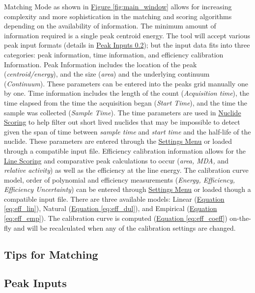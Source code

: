 \documentclass[12pt,report,justified]{SANDreport}
\begin{document}
Matching Mode as shown in \hyperref[fig:main_window]{Figure \ref{fig:main_window}} allows for 
increasing complexity and more sophistication in the matching and scoring algorithms depending 
on the availability of information. The minimum amount of information required is a single peak 
centroid energy. The tool will accept various peak input formats (details in 
\hyperref[sec:peak_inp]{Peak Inputs \ref{sec:peak_inp}}); but the input data fits into three 
categories: peak information, time information, and efficiency calibration Information. Peak 
Information includes the location of the peak (\textit{centroid/energy}), and the size 
(\textit{area}) and the underlying continuum (\textit{Continuum}). These parameters can be 
entered into the peaks grid manually one by one. Time information includes the length of the count 
(\textit{Acquisition time}), the time elapsed from the time the acquisition began 
(\textit{Start Time}), and the time the sample was collected (\textit{Sample Time}). The time 
parameters are used in \hyperref[sec:score]{Nuclide Scoring} to help filter out short lived 
nuclides that may be impossible to detect given the span of time between \textit{sample time} and 
\textit{start time} and the half-life of the nuclide. These parameters are entered through the 
\hyperref[sec:set_menu]{Settings Menu} or loaded through a compatible input file. Efficiency 
calibration information allows for the \hyperref[sec:sec:ln_score]{Line Scoring} and comparative 
peak calculations to occur (\textit{area, MDA,} and \textit{relative activity}) as well as the 
efficiency at the line energy. The calibration curve model, order of polynomial and efficiency 
measurements (\textit{Energy, Efficiency, Efficiency Uncertainty}) can be entered through 
\hyperref[sec:set_menu]{Settings Menu} or loaded though a compatible input file. There are three 
available models: Linear (\hyperref[sec:eq:eff_lin]{Equation \ref{eq:eff_lin}}), Natural 
(\hyperref[eq:eff_dul]{Equation \ref{eq:eff_dul}}), and Empirical 
(\hyperref[eq:eff_emp]{Equation \ref{eq:eff_emp}}). The calibration curve is computed 
(\hyperref[eq:eff_coeff]{Equation \ref{eq:eff_coeff}}) on-the-fly and will be recalculated when any 
of the calibration settings are changed.

\subsection{Tips for Matching} \label{sec:match_tips}
\subsection{Peak Inputs} \label{sec:peak_inp}
\end{document}
